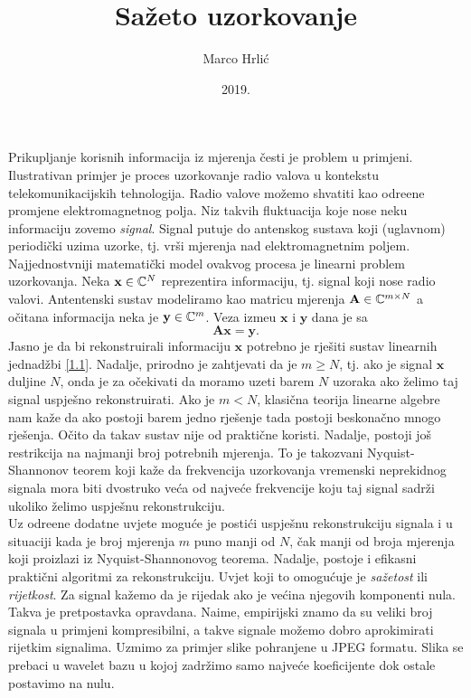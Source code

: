 \documentclass[a4paper,twoside,12pt]{memoir} %
\title{Sa\v{z}eto uzorkovanje}
\author{Marco Hrli\'c}
\date{2019.}  %
\newcommand{\vect}[1]{\mathbf{#1}}
\renewcommand{\vec}{\vect}
\begin{document}
\setlength\abovedisplayskip{10pt}
\setlength\belowdisplayskip{10pt}
\setlength\abovedisplayshortskip{10pt}
\setlength\belowdisplayshortskip{10pt}

\nocite{*}

\frontmatter


\begin{intro}
    Prikupljanje korisnih informacija iz mjerenja \v{c}esti je problem u primjeni. Ilustrativan primjer je proces uzorkovanje radio valova u kontekstu telekomunikacijskih tehnologija. Radio valove mo\v{z}emo shvatiti kao odre\dj ene promjene elektromagnetnog polja. Niz takvih fluktuacija koje nose neku informaciju zovemo \textit{signal}. Signal putuje do antenskog sustava koji (uglavnom) periodi\v{c}ki uzima uzorke, tj. vr\v{s}i mjerenja nad elektromagnetnim poljem. Najjednostvniji matemati\v{c}ki model ovakvog procesa je linearni problem uzorkovanja. Neka $\vec x \in \C^N$ reprezentira informaciju, tj. signal koji nose radio valovi. Antentenski sustav modeliramo kao matricu mjerenja $\vec A \in \C^{m \times N}$ a o\v{c}itana informacija neka je $\vec y \in \C^m$. Veza izme\dj u $\vec x$ i $\vec y$ dana je sa
    \begin{equation}\label{1.1}
        \vec{Ax} = \vec{y}. 
    \end{equation}
    Jasno je da bi rekonstruirali informaciju $\vec x$ potrebno je rje\v{s}iti sustav linearnih jednad\v{z}bi \eqref{1.1}. Nadalje, prirodno je zahtjevati da je $m \geq N$, tj. ako je signal $\vec x$ duljine $N$, onda je za o\v{c}ekivati da moramo uzeti barem $N$ uzoraka ako \v{z}elimo taj signal uspje\v{s}no rekonstruirati. Ako je $m < N$, klasi\v{c}na teorija linearne algebre nam ka\v{z}e da ako postoji barem jedno rje\v{s}enje tada postoji beskona\v{c}no mnogo rje\v{s}enja. O\v{c}ito da takav sustav nije od prakti\v{c}ne koristi. Nadalje, postoji jo\v{s} restrikcija na najmanji broj potrebnih mjerenja. To je takozvani Nyquist-Shannonov teorem koji ka\v{z}e da frekvencija uzorkovanja vremenski neprekidnog signala mora biti dvostruko ve\'ca od najve\'ce frekvencije koju taj signal sadr\v{z}i ukoliko \v{z}elimo uspje\v{s}nu rekonstrukciju. \\
    \indent
    Uz odre\dj ene dodatne uvjete mogu\'ce je posti\'ci uspje\v{s}nu rekonstrukciju signala i u situaciji kada je broj mjerenja $m$ puno manji od $N$, \v{c}ak manji od broja mjerenja koji proizlazi iz Nyquist-Shannonovog teorema. Nadalje, postoje i efikasni prakti\v{c}ni algoritmi za rekonstrukciju. Uvjet koji to omogu\'{c}uje je \textit{sa\v{z}etost} ili \textit{rijetkost}. Za signal ka\v{z}emo da je rijedak ako je ve\'cina njegovih komponenti nula. Takva je pretpostavka opravdana. Naime, empirijski znamo da su veliki broj signala u primjeni kompresibilni, a takve signale mo\v{z}emo dobro aprokimirati rijetkim signalima. Uzmimo za primjer slike pohranjene u JPEG formatu. Slika se prebaci u wavelet bazu u kojoj zadr\v{z}imo samo najve\'ce koeficijente dok ostale postavimo na nulu.\\

\end{intro}
\end{document}
